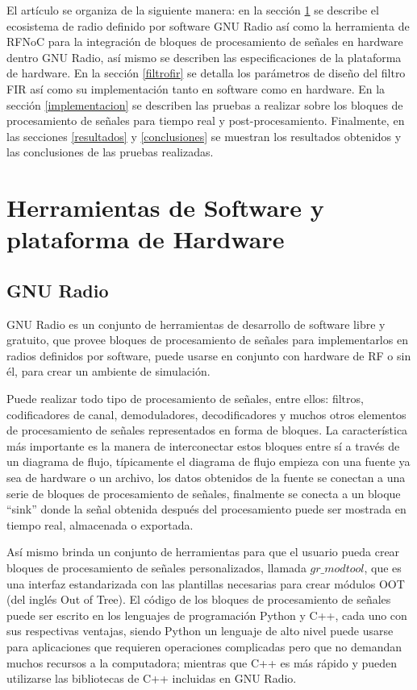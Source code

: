 \documentclass[12pt]{difu100cia} %
\begin{document}
El artículo se organiza de la siguiente manera: en la sección \ref{herramientas} se describe el ecosistema de radio definido por software GNU Radio así como la herramienta de RFNoC para la integración de bloques de procesamiento de señales en hardware dentro GNU Radio, así mismo se describen las especificaciones de la plataforma de hardware. En la sección \ref{filtrofir} se detalla los parámetros de diseño del filtro FIR así como su implementación tanto en software como en hardware. En la sección \ref{implementacion} se describen las pruebas a realizar sobre los bloques de procesamiento de señales para tiempo real y post-procesamiento. Finalmente, en las secciones \ref{resultados} y \ref{conclusiones} se muestran los resultados obtenidos y las conclusiones de las pruebas realizadas.

\section{Herramientas de Software y plataforma de Hardware}
\label{herramientas}
\subsection{GNU Radio}

GNU Radio es un conjunto de herramientas de desarrollo de software libre y gratuito, que provee bloques de procesamiento de señales para implementarlos en radios definidos por software, puede usarse en conjunto con hardware de RF o sin él, para crear un ambiente de simulación. 

Puede realizar todo tipo de procesamiento de señales, entre ellos: filtros, codificadores de canal, demoduladores, decodificadores y muchos otros elementos de procesamiento de señales representados en forma de bloques. La característica más importante es la manera de interconectar estos bloques entre sí a través de un diagrama de flujo, típicamente el diagrama de flujo empieza con una fuente ya sea de hardware o un archivo, los datos obtenidos de la fuente se conectan a una serie de bloques de procesamiento de señales, finalmente se conecta a un bloque ``sink'' donde la señal obtenida después del procesamiento puede ser mostrada en tiempo real, almacenada o exportada. 

Así mismo brinda un conjunto de herramientas para que el usuario pueda crear bloques de procesamiento de señales personalizados, llamada  $gr\_modtool$, que es una interfaz estandarizada con las plantillas necesarias para crear módulos OOT (del inglés Out of Tree). El código de los bloques de procesamiento de señales puede ser escrito en los lenguajes de programación Python y C++, cada uno con sus respectivas ventajas, siendo Python un lenguaje de alto nivel puede usarse para aplicaciones que requieren operaciones complicadas pero que no demandan muchos recursos a la computadora; mientras que C++ es más rápido y pueden utilizarse las bibliotecas de C++ incluidas en GNU Radio. 
\end{document}
